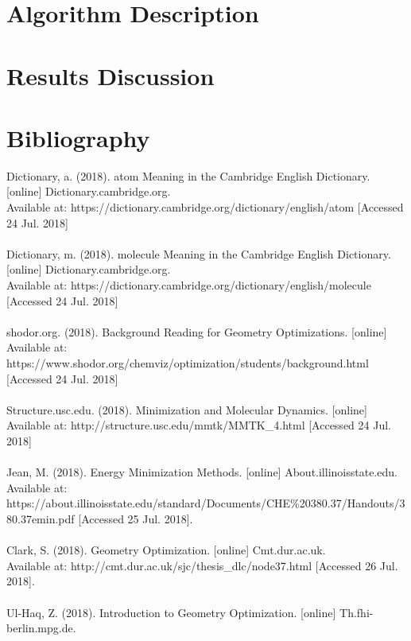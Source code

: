 \documentclass[9pt]{article}
\begin{document}
\section{Algorithm Description}

\section{Results Discussion}

\section{Bibliography}

Dictionary, a. (2018). atom Meaning in the Cambridge English Dictionary. [online] Dictionary.cambridge.org. 
\\Available at: https://dictionary.cambridge.org/dictionary/english/atom [Accessed 24 Jul. 2018]
\\
\\
Dictionary, m. (2018). molecule Meaning in the Cambridge English Dictionary. [online] Dictionary.cambridge.org.
\\Available at: https://dictionary.cambridge.org/dictionary/english/molecule [Accessed 24 Jul. 2018]
\\
\\
shodor.org. (2018). Background Reading for Geometry Optimizations. [online] 
\\Available at: https://www.shodor.org/chemviz/optimization/students/background.html [Accessed 24 Jul. 2018]
\\
\\
Structure.usc.edu. (2018). Minimization and Molecular Dynamics. [online] 
\\Available at: http://structure.usc.edu/mmtk/MMTK\_4.html [Accessed 24 Jul. 2018]
\\
\\
Jean, M. (2018). Energy Minimization Methods. [online]  About.illinoisstate.edu.
\\Available at: https://about.illinoisstate.edu/standard/Documents/CHE\%20380.37/Handouts/380.37emin.pdf [Accessed 25 Jul. 2018].
\\
\\
Clark, S. (2018). Geometry Optimization. [online] Cmt.dur.ac.uk. 
\\Available at: http://cmt.dur.ac.uk/sjc/thesis\_dlc/node37.html [Accessed 26 Jul. 2018].
\\
\\
Ul-Haq, Z. (2018). Introduction to Geometry Optimization. [online] Th.fhi-berlin.mpg.de. 
\end{document}
